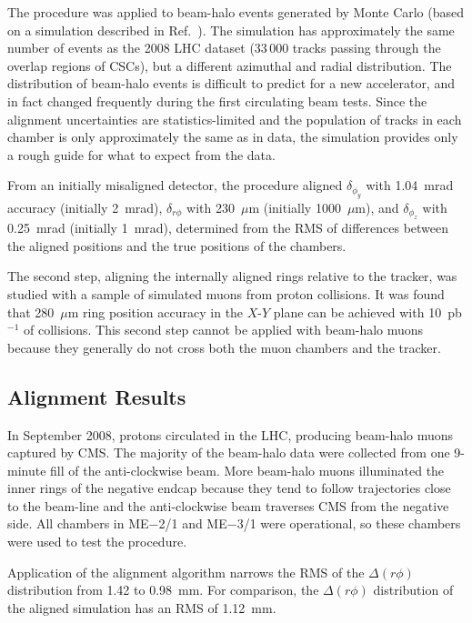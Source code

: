\documentclass[11pt,twoside,a4paper,cmspaper]{cms-tdr}
\begin{document}
The procedure was applied to beam-halo events generated by Monte Carlo
(based on a simulation described in Ref.~\cite{CMS_NOTE_2005-012}).  The
simulation has approximately the same number of events as the 2008 LHC
dataset (33$\,$000 tracks passing through the overlap regions of
CSCs), but a different azimuthal and radial distribution.  The
distribution of beam-halo events is difficult to predict for a new
accelerator, and in fact changed frequently during the first
circulating beam tests.  Since the alignment uncertainties are
statistics-limited and the population of tracks in each chamber is
only approximately the same as in data, the simulation provides only a
rough guide for what to expect from the data.

From an initially misaligned detector, the procedure aligned
$\delta_{\phi_y}$ with 1.04~mrad accuracy (initially 2~mrad), $\delta_{r\phi}$ with
230~$\mu$m (initially 1000~$\mu$m), and $\delta_{\phi_z}$ with
0.25~mrad (initially 1~mrad), determined from the
RMS of differences between the aligned positions and the true
positions of the chambers.

The second step, aligning the internally aligned rings relative to the
tracker, was studied with a sample of simulated muons from proton
collisions.  It was found that 280~$\mu$m ring position accuracy in
the $X$-$Y$ plane can be achieved with 10~pb$^{-1}$ of collisions.
This second step cannot be applied with beam-halo muons because they
generally do not cross both the muon chambers and the tracker.

\subsection{Alignment Results}

In September 2008, protons circulated in the LHC, producing beam-halo
muons captured by CMS.  The majority of the beam-halo data were
collected from one 9-minute fill of the anti-clockwise beam.  More
beam-halo muons illuminated the inner rings of the negative endcap
because they tend to follow trajectories close to the beam-line and
the anti-clockwise beam traverses CMS from the negative side.  All
chambers in ME$-$2/1 and ME$-$3/1 were operational, so these chambers
were used to test the procedure.

Application of the alignment algorithm narrows the RMS of the $\Delta
(r\phi)$ distribution from 1.42 to 0.98~mm.  For comparison, the
$\Delta (r\phi)$ distribution of the aligned simulation has an RMS of
1.12~mm.
\end{document}
